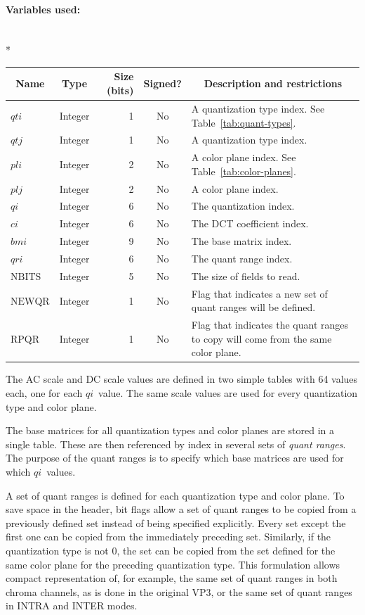 \documentclass[11pt,letterpaper]{book}
\newcommand{\idx}[1]{{\ensuremath{\mathit{#1}}}}
\newcommand{\qti}{\idx{qti}}
\newcommand{\qtj}{\idx{qtj}}
\newcommand{\pli}{\idx{pli}}
\newcommand{\plj}{\idx{plj}}
\newcommand{\qi}{\idx{qi}}
\newcommand{\ci}{\idx{ci}}
\newcommand{\bmi}{\idx{bmi}}
\newcommand{\qri}{\idx{qri}}
\newcommand{\locvar}[1]{\ensuremath{\mathrm{#1}}}
\newcommand{\term}[1]{{\em #1}}
\numberwithin{equation}{chapter}
\numberwithin{figure}{chapter}
\numberwithin{table}{chapter}
\begin{document}
\paragraph{Variables used:}\hfill\\*
\begin{tabularx}{\textwidth}{@{}llrcX@{}}\toprule
\multicolumn{1}{c}{Name} &
\multicolumn{1}{c}{Type} &
\multicolumn{1}{p{30pt}}{\centering Size (bits)} &
\multicolumn{1}{c}{Signed?} &
\multicolumn{1}{c}{Description and restrictions} \\\midrule\endhead
\locvar{\qti}    & Integer &  1 & No & A quantization type index.
See Table~\ref{tab:quant-types}.\\
\locvar{\qtj}    & Integer &  1 & No & A quantization type index. \\
\locvar{\pli}    & Integer &  2 & No & A color plane index.
See Table~\ref{tab:color-planes}.\\
\locvar{\plj}    & Integer &  2 & No & A color plane index. \\
\locvar{\qi}     & Integer &  6 & No & The quantization index. \\
\locvar{\ci}     & Integer &  6 & No & The DCT coefficient index. \\
\locvar{\bmi}    & Integer &  9 & No & The base matrix index. \\
\locvar{\qri}    & Integer &  6 & No & The quant range index. \\
\locvar{NBITS}   & Integer &  5 & No & The size of fields to read. \\
\locvar{NEWQR}   & Integer &  1 & No & Flag that indicates a new set of quant
 ranges will be defined. \\
\locvar{RPQR}    & Integer &  1 & No & Flag that indicates the quant ranges to
 copy will come from the same color plane. \\
\bottomrule\end{tabularx}
\medskip

The AC scale and DC scale values are defined in two simple tables with 64
 values each, one for each \qi\ value.
The same scale values are used for every quantization type and color plane.

The base matrices for all quantization types and color planes are stored in a
 single table.
These are then referenced by index in several sets of \term{quant ranges}.
The purpose of the quant ranges is to specify which base matrices are used for
 which \qi\ values.

A set of quant ranges is defined for each quantization type and color plane.
To save space in the header, bit flags allow a set of quant ranges to be copied
 from a previously defined set instead of being specified explicitly.
Every set except the first one can be copied from the immediately preceding
 set.
Similarly, if the quantization type is not $0$, the set can be copied from the
 set defined for the same color plane for the preceding quantization type.
This formulation allows compact representation of, for example, the same 
 set of quant ranges in both chroma channels, as is done in the original VP3,
 or the same set of quant ranges in INTRA and INTER modes.
\end{document}
